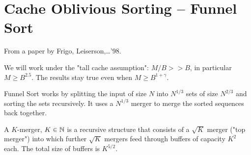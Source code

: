 \section{Cache Oblivious Sorting -- Funnel Sort}

From a paper by Frigo, Leiserson,\ldots '98.

We will work under the "tall cache assumption": $M/B>> B$, in particular $M\geq B^{2.5}$. The results stay true even when $M\geq B^{1+\gamma}$.

Funnel Sort works by splitting the input of size $N$ into $N^{1/3}$ sets of size $N^{2/3}$ and sorting the sets recursively. It uses a $N^{1/3}$ merger to merge the sorted sequences back together.

A $K$-merger, $K\in \mathbb{N}$ is a recursive structure that consists of a $\sqrt K$ merger ("top merger") into which further $\sqrt{K}$ mergers feed through buffers of capacity $K^2$ each. The total size of buffers is $K^{5/2}$. 